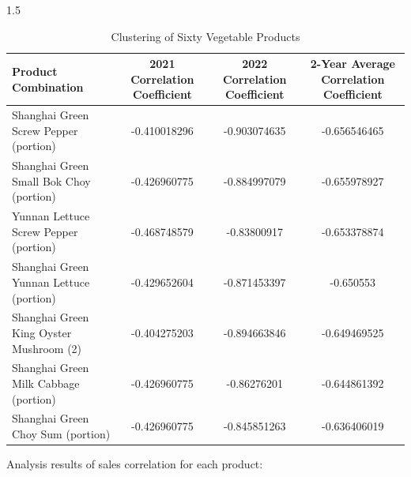 \documentclass{article}
\begin{document}
	\begin{table}[h]
		\centering
		\caption{Clustering of Sixty Vegetable Products}
		\renewcommand{\heavyrulewidth}{1.2pt}
		\begin{spacing}{1.5}
			\begin{tabular}{@{}lccc@{}}
				\toprule
				\textbf{Product Combination} & \textbf{2021 Correlation Coefficient} & \textbf{2022 Correlation Coefficient} & \textbf{2-Year Average Correlation Coefficient} \\
				\midrule
				Shanghai Green Screw Pepper (portion) & -0.410018296 & -0.903074635 & -0.656546465 \\
				Shanghai Green Small Bok Choy (portion) & -0.426960775 & -0.884997079 & -0.655978927 \\
				Yunnan Lettuce Screw Pepper (portion) & -0.468748579 & -0.83800917 & -0.653378874 \\
				Shanghai Green Yunnan Lettuce (portion) & -0.429652604 & -0.871453397 & -0.650553 \\
				Shanghai Green King Oyster Mushroom (2) & -0.404275203 & -0.894663846 & -0.649469525 \\
				Shanghai Green Milk Cabbage (portion) & -0.426960775 & -0.86276201 & -0.644861392 \\
				Shanghai Green Choy Sum (portion) & -0.426960775 & -0.845851263 & -0.636406019 \\
				\bottomrule
			\end{tabular}
		\end{spacing}
		\renewcommand{\heavyrulewidth}{0.8pt}
	\end{table}
	
	Analysis results of sales correlation for each product:
	
\end{document}
